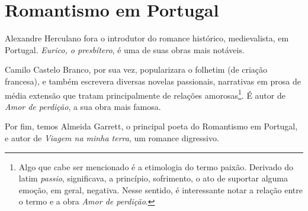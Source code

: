 
\chapter{Romantismo em Portugal}

Alexandre Herculano fora o introdutor do romance histórico, medievalista, em Portugal. \textit{Eurico, o presbítero}, é uma de suas obras mais notáveis.

Camilo Castelo Branco, por sua vez, popularizara o folhetim (de criação francesa), e também escrevera diversas novelas passionais, narrativas em prosa de média extensão que tratam principalmente de relações amorosas\footnote{Algo que cabe ser mencionado é a etimologia do termo paixão. Derivado do latim \textit{passio}, significava, a princípio, sofrimento, o ato de suportar alguma emoção, em geral, negativa. Nesse sentido, é interessante notar a relação entre o termo e a obra \textit{Amor de perdição}.}. É autor de \textit{Amor de perdição}, a sua obra mais famosa.

Por fim, temos Almeida Garrett, o principal poeta do Romantismo em Portugal, e autor de \textit{Viagem na minha terra}, um romance digressivo.